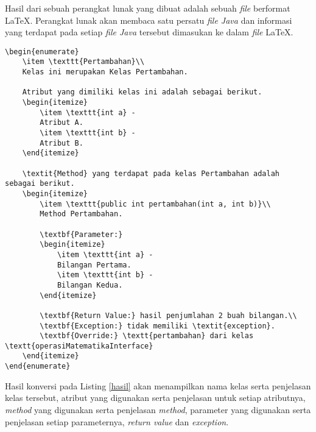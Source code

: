 Hasil dari sebuah perangkat lunak yang dibuat adalah sebuah {\it file} berformat \LaTeX. Perangkat lunak akan membaca satu persatu {\it file Java} dan informasi yang terdapat pada setiap {\it file Java} tersebut dimasukan ke dalam {\it file} \LaTeX.

\begin{lstlisting}[caption=Contoh hasil konversi {\it Javadoc} ke \LaTeX, label={hasil}]
\begin{enumerate}
	\item \texttt{Pertambahan}\\
	Kelas ini merupakan Kelas Pertambahan.
	
	Atribut yang dimiliki kelas ini adalah sebagai berikut.
	\begin{itemize}
		\item \texttt{int a} -
		Atribut A.
		\item \texttt{int b} -
		Atribut B.
	\end{itemize}
	
	\textit{Method} yang terdapat pada kelas Pertambahan adalah sebagai berikut.
	\begin{itemize}
		\item \texttt{public int pertambahan(int a, int b)}\\
		Method Pertambahan.
		
		\textbf{Parameter:}
		\begin{itemize}
			\item \texttt{int a} - 
			Bilangan Pertama.
			\item \texttt{int b} - 
			Bilangan Kedua.
		\end{itemize}
		
		\textbf{Return Value:} hasil penjumlahan 2 buah bilangan.\\
		\textbf{Exception:} tidak memiliki \textit{exception}.
		\textbf{Override:} \textt{pertambahan} dari kelas \textt{operasiMatematikaInterface}
	\end{itemize}
\end{enumerate}
\end{lstlisting}

Hasil konversi pada Listing \ref{hasil} akan menampilkan nama kelas serta penjelasan kelas tersebut, atribut yang digunakan serta penjelasan untuk setiap atributnya, {\it method} yang digunakan serta penjelasan {\it method}, parameter yang digunakan serta penjelasan setiap parameternya, {\it return value} dan {\it exception}.

